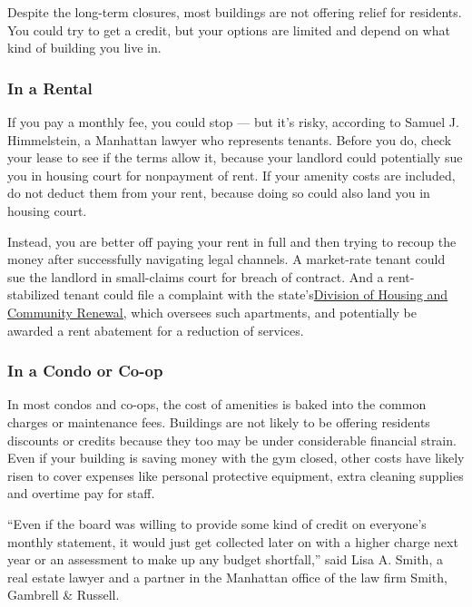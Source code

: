 Despite the long-term closures, most buildings are not offering relief
for residents. You could try to get a credit, but your options are
limited and depend on what kind of building you live in.

\hypertarget{in-a-rental}{%
\subsubsection{\texorpdfstring{\textbf{In a
Rental}}{In a Rental}}\label{in-a-rental}}

If you pay a monthly fee, you could stop --- but it's risky, according
to Samuel J. Himmelstein, a Manhattan lawyer who represents tenants.
Before you do, check your lease to see if the terms allow it, because
your landlord could potentially sue you in housing court for nonpayment
of rent. If your amenity costs are included, do not deduct them from
your rent, because doing so could also land you in housing court.

Instead, you are better off paying your rent in full and then trying to
recoup the money after successfully navigating legal channels. A
market-rate tenant could sue the landlord in small-claims court for
breach of contract. And a rent-stabilized tenant could file a complaint
with the
state's\href{https://hcr.ny.gov/division-housing-and-community-renewal}{Division
of Housing and Community Renewal,} which oversees such apartments, and
potentially be awarded a rent abatement for a reduction of services.

\hypertarget{in-a-condo-or-co-op}{%
\subsubsection{\texorpdfstring{\textbf{In a Condo or
Co-op}}{In a Condo or Co-op}}\label{in-a-condo-or-co-op}}

In most condos and co-ops, the cost of amenities is baked into the
common charges or maintenance fees. Buildings are not likely to be
offering residents discounts or credits because they too may be under
considerable financial strain. Even if your building is saving money
with the gym closed, other costs have likely risen to cover expenses
like personal protective equipment, extra cleaning supplies and overtime
pay for staff.

``Even if the board was willing to provide some kind of credit on
everyone's monthly statement, it would just get collected later on with
a higher charge next year or an assessment to make up any budget
shortfall,'' said Lisa A. Smith, a real estate lawyer and a partner in
the Manhattan office of the law firm Smith, Gambrell \& Russell.


